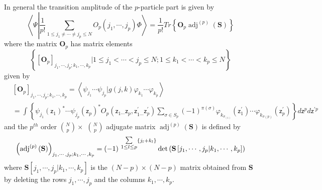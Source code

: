 \documentclass[aps,preprint]{revtex4}%
\begin{document}
In general the transition amplitude of the $p$-particle part is given by%
\begin{equation}
\left\langle \Psi\left\vert \frac{1}{p!}%
{\displaystyle\sum\limits_{1\leq j_{1}\neq\cdots\neq j_{p}\leq N}}
O_{p}\left(  j_{1},\cdots,j_{p}\right)  \right.  \Phi\right\rangle =\frac
{1}{p!}Tr\left\{  \mathbf{O}_{p}\operatorname{adj}^{\left(  p\right)  }\left(
\mathbf{S}\right)  \right\}
\end{equation}
where the matrix $\mathbf{O}_{p}$ has matrix elements
\begin{equation}
\left\{  \left[  \mathbf{O}_{p}\right]  _{j_{1},\cdots,j_{p};k_{1}%
,\cdots,k_{p}}|1\leq j_{1}<\cdots<j_{p}\leq N;1\leq k_{1}<\cdots<k_{p}\leq
N\right\}
\end{equation}
given by
\begin{align}
&  \left[  \mathbf{O}_{p}\right]  _{j_{1},\cdots,j_{p};k_{1},\cdots,k_{p}%
}=\left\langle \psi_{j_{1}}\cdots\psi_{j_{p}}|g\left(  j,k\right)
\varphi_{k_{1}}\cdots\varphi_{k_{p}}\right\rangle \nonumber\\
&  =%
{\displaystyle\int}
\left\{  \psi_{j_{1}}\left(  \mathsf{z}_{1}\right)  ^{\ast}\cdots\psi_{j_{p}%
}\left(  \mathsf{z}_{p}\right)  ^{\ast}O_{p}\left(  \mathsf{z}_{1\cdots
}\mathsf{z}_{p}\mathsf{,z}_{1\cdots}^{\prime}\mathsf{z}_{p}^{\prime}\right)
{\displaystyle\sum\limits_{\sigma\in S_{p}}}
\left(  -1\right)  ^{\pi\left(  \sigma\right)  }\varphi_{k_{\sigma_{\left(
1\right)  }}}\left(  \mathsf{z}_{1}^{\prime}\right)  \cdots\varphi
_{k_{\sigma\left(  p\right)  }}\left(  \mathsf{z}_{p}^{\prime}\right)
\right\}  d\mathsf{z}^{p}d\mathsf{z}^{\prime p}%
\end{align}
and the $p^{th}$ order $\binom{N}{p}\times$ $\binom{N}{p}$ adjugate matrix
$\operatorname{adj}^{\left(  p\right)  }\left(  \mathbf{S}\right)  $ is
defined by
\begin{equation}
\left(  \operatorname{adj}^{\left(  p\right)  }\left(  \mathbf{S}\right)
\right)  _{j_{1},\cdots,j_{p};k_{1},\cdots,k_{p}}=\left(  -1\right)  \,^{%
{\textstyle\sum\limits_{1\leq l\leq p}}
\left\{  j_{l}+k_{l}\right\}  }\det\left(  \mathbf{S}\left[  j_{1}%
,\cdots,j_{p}|k_{1},\cdots,k_{p}\right]  \right)
\end{equation}
where $\mathbf{S}\left[  j_{1},\cdots,j_{p}|k_{1},\cdots,k_{p}\right]  $ is
the $\left(  N-p\right)  \times\left(  N-p\right)  $ matrix obtained from
$\mathbf{S}$ by deleting the rows $j_{1},\cdots,j_{p}$ and the columns
$k_{1},\cdots,k_{p}$.
\end{document}
